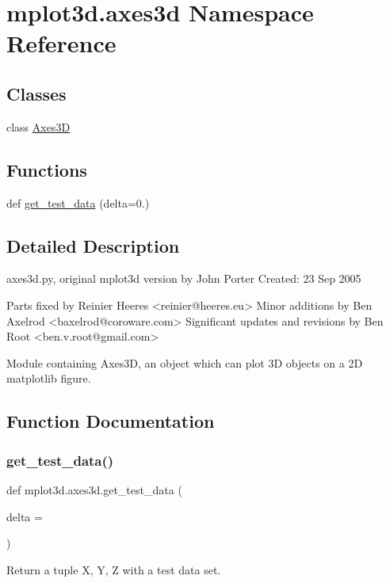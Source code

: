 \hypertarget{namespacemplot3d_1_1axes3d}{}\section{mplot3d.\+axes3d Namespace Reference}
\label{namespacemplot3d_1_1axes3d}
\subsection*{Classes}
\begin{DoxyCompactItemize}
\item 
class \hyperlink{classmplot3d_1_1axes3d_1_1Axes3D}{Axes3D}
\end{DoxyCompactItemize}
\subsection*{Functions}
\begin{DoxyCompactItemize}
\item 
def \hyperlink{namespacemplot3d_1_1axes3d_aa295b3db6d84412b64987f7d199acfab}{get\+\_\+test\+\_\+data} (delta=0.)
\end{DoxyCompactItemize}


\subsection{Detailed Description}
\begin{DoxyVerb}axes3d.py, original mplot3d version by John Porter
Created: 23 Sep 2005

Parts fixed by Reinier Heeres <reinier@heeres.eu>
Minor additions by Ben Axelrod <baxelrod@coroware.com>
Significant updates and revisions by Ben Root <ben.v.root@gmail.com>

Module containing Axes3D, an object which can plot 3D objects on a
2D matplotlib figure.
\end{DoxyVerb}
 

\subsection{Function Documentation}
\mbox{\label{namespacemplot3d_1_1axes3d_aa295b3db6d84412b64987f7d199acfab}} 
\subsubsection{\texorpdfstring{get\+\_\+test\+\_\+data()}{get\_test\_data()}}
{\footnotesize\ttfamily def mplot3d.\+axes3d.\+get\+\_\+test\+\_\+data (\begin{DoxyParamCaption}\item[{}]{delta = {} }\end{DoxyParamCaption})}

\begin{DoxyVerb}Return a tuple X, Y, Z with a test data set.\end{DoxyVerb}
 